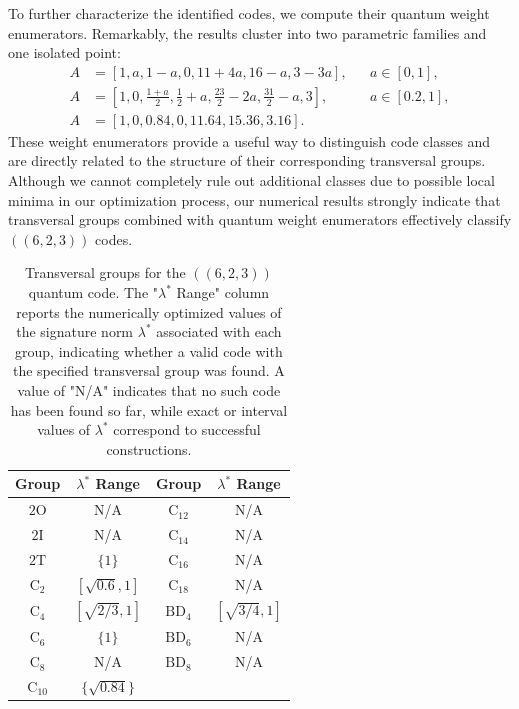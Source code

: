 \documentclass[8pt]{article}
\theoremstyle{definition}
\begin{document}
To further characterize the identified codes, we compute their quantum weight enumerators. Remarkably, the results cluster into two parametric families and one isolated point:
\begin{align}
    A &= \left[1,a,1-a,0,11+4a,16-a,3-3a\right],                                            & &a \in [0,1], \label{eq:623-shorwt-SU4}\\
    A &= \left[1,0,\tfrac{1+a}{2},\tfrac{1}{2}+a,\tfrac{23}{2}-2a,\tfrac{31}{2}-a,3\right], & &a \in [0.2,1], \label{eq:623-shorwt-SO5}\\
    A &= \left[1,0,0.84,0,11.64,15.36,3.16\right]. \label{eq:623-shorwt-C10}
\end{align}
These weight enumerators provide a useful way to distinguish code classes and are directly related to the structure of their corresponding transversal groups. Although we cannot completely rule out additional classes due to possible local minima in our optimization process, our numerical results strongly indicate that transversal groups combined with quantum weight enumerators effectively classify \(((6,2,3))\) codes.

\begin{table}[h!]
    \centering
    \begin{tabular}{c | c || c | c}
        \toprule
        Group             & $\lambda^*$ Range & Group             & $\lambda^*$ Range \\
        \midrule
        $2\mathrm{O}$     & N/A               & $\mathrm{C}_{12}$ & N/A               \\
        $2\mathrm{I}$     & N/A               & $\mathrm{C}_{14}$ & N/A               \\
        $2\mathrm{T}$     & $\{1\}$           & $\mathrm{C}_{16}$ & N/A               \\
        $\mathrm{C}_2$    & $[\sqrt{0.6},1]$  & $\mathrm{C}_{18}$ & N/A               \\
        $\mathrm{C}_4$    & $[\sqrt{2/3},1]$  & $\mathrm{BD}_4$   & $[\sqrt{3/4},1]$  \\
        $\mathrm{C}_6$    & $\{1\}$           & $\mathrm{BD}_6$   & N/A               \\
        $\mathrm{C}_8$    & N/A               & $\mathrm{BD}_8$   & N/A               \\
        $\mathrm{C}_{10}$ & $\{\sqrt{0.84}\}$ &                   &                   \\
        \bottomrule
    \end{tabular}
    \caption{Transversal groups for the \(((6,2,3))\) quantum code. The "\(\lambda^*\) Range" column reports the numerically optimized values of the signature norm \(\lambda^*\) associated with each group, indicating whether a valid code with the specified transversal group was found. A value of "N/A" indicates that no such code has been found so far, while exact or interval values of \(\lambda^*\) correspond to successful constructions.}
    \label{table:623-trans-group}
\end{table}
\end{document}
